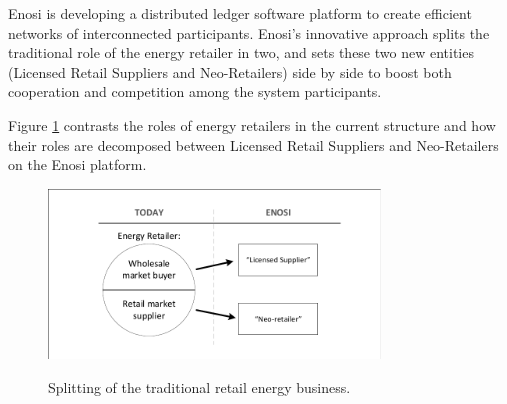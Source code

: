 \documentclass[a4paper,12pt,reqno]{amsart}
\theoremstyle{definition}
\begin{document}
Enosi is developing a distributed ledger software platform to create efficient networks of interconnected participants.   Enosi's innovative approach splits the traditional role of the energy retailer in two, and sets these two new entities (Licensed Retail Suppliers and Neo-Retailers) side by side to boost both cooperation and competition among the system participants. %

Figure \ref{fig1} contrasts the roles of energy retailers in the current structure and how their roles are decomposed between Licensed Retail Suppliers and Neo-Retailers on the Enosi platform. 
% 
% 
% 
% 
% 
% 
\vspace{+1em}

\begin{figure}[h!]
\begin{center}
\includegraphics[width=250pt]{enosi-retailer-split}\\
\caption{Splitting of the traditional retail energy business.}\label{fig1}
\end{center}
\end{figure}
\end{document}
